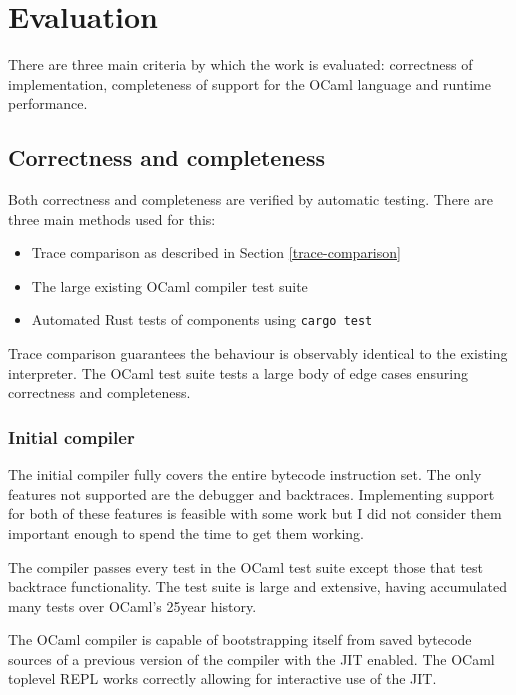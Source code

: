 \chapter{Evaluation}

There are three main criteria by which the work is evaluated: correctness of implementation,
completeness of support for the OCaml language and runtime performance.

\section{Correctness and completeness}

Both correctness and completeness are verified by automatic testing. There are three main methods
used for this:

\begin{itemize}
      \item Trace comparison as described in Section \ref{trace-comparison}
      \item The large existing OCaml compiler test suite
      \item Automated Rust tests of components using \texttt{cargo test}
\end{itemize}

Trace comparison guarantees the behaviour is observably identical to the existing interpreter. The
OCaml test suite tests a large body of edge cases ensuring correctness and completeness.

\subsection{Initial compiler}

The initial compiler fully covers the entire bytecode instruction set. The only features not
supported are the debugger and backtraces. Implementing support for both of these features is
feasible with some work but I did not consider them important enough to spend the time to get them
working.

The compiler passes every test in the OCaml test suite except those that test backtrace
functionality. The test suite is large and extensive, having accumulated many tests over OCaml's
25year history.

The OCaml compiler is capable of bootstrapping itself from saved bytecode sources
of a previous version of the compiler with the JIT enabled. The OCaml toplevel REPL works
correctly allowing for interactive use of the JIT.

